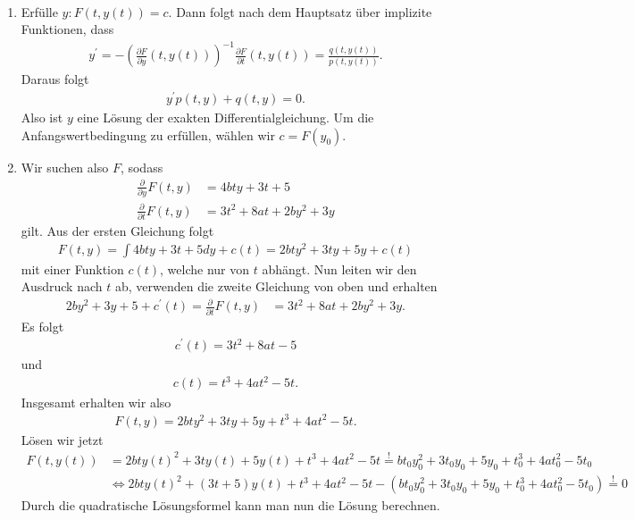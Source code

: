 \begin{solution}
\leavevmode \\
\begin{enumerate}[label = \textbf{\alph*)}]
\item Erfülle $y: F(t,y(t)) = c$. Dann folgt nach dem Hauptsatz über implizite
Funktionen, dass
\begin{align*}
  y^{\prime} = -\left(\frac{\partial F}{\partial y}(t,y(t))\right)^{-1}
  \frac{\partial F}{\partial t}(t,y(t)) = \frac{q(t,y(t))}{p(t,y(t))}.
\end{align*}
Daraus folgt
\begin{align*}
  y^{\prime}p(t,y) + q(t,y) = 0.
\end{align*}
Also ist $y$ eine Lösung der exakten Differentialgleichung. Um die Anfangswertbedingung
zu erfüllen, wählen wir $c = F(y_0)$.
\item Wir suchen also $F$, sodass
\begin{align*}
  \frac{\partial}{\partial y}F(t,y) &= 4bty + 3t + 5 \\
  \frac{\partial}{\partial t}F(t,y) &= 3t^2 + 8at + 2by^2 + 3y
\end{align*}
gilt. Aus der ersten Gleichung folgt
\begin{align*}
  F(t,y) = \int 4bty + 3t + 5 dy + c(t) = 2bty^2 + 3ty + 5y + c(t)
\end{align*}
mit einer Funktion $c(t)$, welche nur von $t$ abhängt.
Nun leiten wir den Ausdruck nach $t$ ab, verwenden die zweite Gleichung von oben
und erhalten
\begin{align*}
  2by^2 + 3y + 5 + c^{\prime}(t) = \frac{\partial}{\partial t}F(t,y) &= 3t^2 + 8at + 2by^2 + 3y.
\end{align*}
Es folgt
\begin{align*}
  c^{\prime}(t) = 3t^2 + 8at - 5
\end{align*}
und
\begin{align*}
  c(t) = t^3 + 4at^2 - 5t.
\end{align*}
Insgesamt erhalten wir also
\begin{align*}
  F(t,y) = 2bty^2 + 3ty + 5y + t^3 + 4at^2 - 5t.
\end{align*}
Lösen wir jetzt
\begin{align*}
  F(t,y(t)) &= 2bty(t)^2 + 3ty(t) + 5y(t) + t^3 + 4at^2 - 5t \stackrel{!}{=}
  bt_0y_0^2 + 3t_0y_0 + 5y_0 + t_0^3 + 4at_0^2 - 5t_0\\
  &\iff 2bty(t)^2 + (3t + 5)y(t) + t^3 + 4at^2 - 5t -
  (bt_0y_0^2 + 3t_0y_0 + 5y_0 + t_0^3 + 4at_0^2 - 5t_0) \stackrel{!}{=} 0
\end{align*}
Durch die quadratische Lösungsformel kann man nun die Lösung berechnen.
\end{enumerate}
\end{solution}
